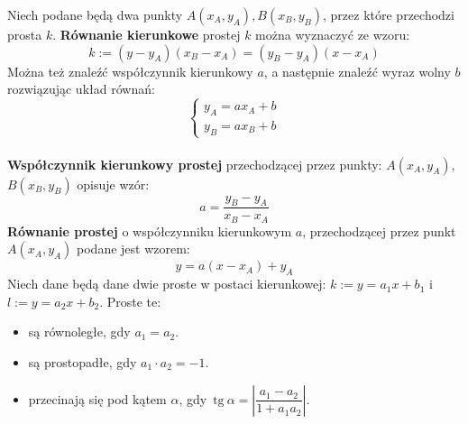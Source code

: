 \documentclass[14pt,a4paper]{extarticle}
\newcommand{\verts}[1]{\left\lvert#1\right\rvert}
\newcommand{\tg}{\,\text{tg}\:}
\begin{document}
\noindent Niech podane będą dwa punkty $A(x_{A}, y_{A}), B(x_{B}, y_{B})$, przez które przechodzi prosta $k$. \textbf{Równanie kierunkowe} prostej
$k$ można wyznaczyć ze wzoru:
$$k:=(y - y_{A})(x_{B}-x_{A}) = (y_{B}-y_{A})(x - x_{A})$$
Można też znaleźć współczynnik kierunkowy $a$, a następnie znaleźć wyraz wolny $b$ rozwiązując układ równań:
\begin{equation*}
   \left\{
      \begin{array}{l}
         y_{A} = ax_{A} + b\\
         y_{B} = ax_{B} + b
      \end{array}
   \right.
   \end{equation*}
\hfill\break\\
\noindent \textbf{Współczynnik kierunkowy prostej} przechodzącej przez punkty: $A(x_{A}, y_{A})$, $B(x_{B}, y_{B})$ opisuje
wzór:
$$a = \dfrac{y_{B}-y_{A}}{x_{B}-x_{A}}$$
\textbf{Równanie prostej} o współczynniku kierunkowym $a$, przechodzącej przez punkt $A(x_{A}, y_{A})$ podane
jest wzorem:
$$y = a(x - x_{A}) + y_{A}$$
\newpage
\noindent Niech dane będą dane dwie proste w postaci kierunkowej: $k\!:=y=a_{1}x+b_{1}$ i $l\!:=y=a_{2}x+b_{2}$.
Proste te:
\begin{itemize}
   \item są równoległe, gdy $a_{1} = a_{2}$.
   \item są prostopadłe, gdy $a_{1}\cdot a_{2} = -1$.
   \item przecinają się pod kątem $\alpha$, gdy $\tg\alpha = \verts{\dfrac{a_{1}-a_{2}}{1+a_{1}a_{2}}}$.
\end{itemize}
\end{document}
